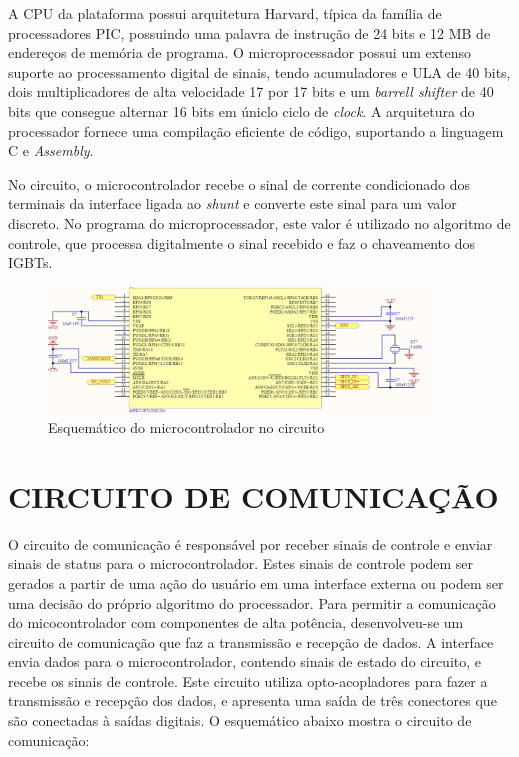 A CPU da plataforma possui arquitetura Harvard, típica da família de processadores PIC, possuindo uma palavra de instrução de 24 bits e 12 MB de endereços de memória de programa. O microprocessador possui um extenso suporte ao processamento digital de sinais, tendo acumuladores e ULA de 40 bits, dois multiplicadores de alta velocidade 17 por 17 bits e um \textit{barrell shifter} de 40 bits que consegue alternar 16 bits em úniclo ciclo de \textit{clock}. A arquitetura do processador fornece uma compilação eficiente de código, suportando a linguagem C e \textit{Assembly}.

No circuito, o microcontrolador recebe o sinal de corrente  condicionado dos terminais da interface ligada ao \textit{shunt} e converte este sinal para um valor discreto. No programa do microprocessador, este valor é utilizado no algoritmo de controle, que processa digitalmente o sinal recebido e faz o chaveamento dos IGBTs.

\begin{figure}[H]
    \centering
    \includegraphics[width=0.9\textwidth]{./dados/figuras/proj-uc}
    \caption{Esquemático do microcontrolador no circuito}
    \label{fig:figura-dspic}
\end{figure}


\section{CIRCUITO DE COMUNICAÇÃO}
\label{sec:commCircuit}
O circuito de comunicação é responsável por receber sinais de controle e enviar sinais de status para o microcontrolador. Estes sinais de controle podem ser gerados a partir de uma ação do usuário em uma interface externa ou podem ser uma decisão do próprio algoritmo do processador. Para permitir a comunicação do micocontrolador com componentes de alta potência, desenvolveu-se um circuito de comunicação que faz a transmissão e recepção de dados. A interface envia dados para o microcontrolador, contendo sinais de estado do circuito, e recebe os sinais de controle. Este circuito utiliza opto-acopladores para fazer a transmissão e recepção dos dados, e apresenta uma saída de três conectores que são conectadas à saídas digitais. O esquemático abaixo mostra o circuito de comunicação:

